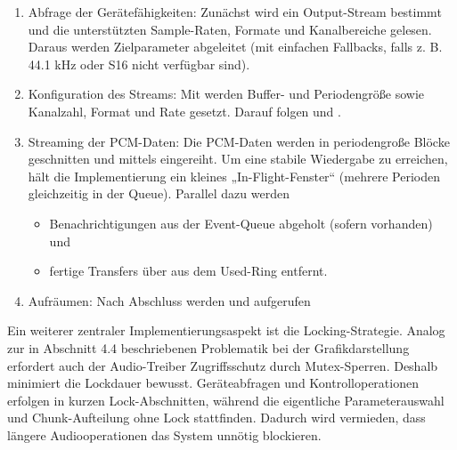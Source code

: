 \begin{enumerate}
 \item Abfrage der Gerätefähigkeiten: Zunächst wird ein Output-Stream bestimmt und die unterstützten Sample-Raten, Formate und Kanalbereiche gelesen. Daraus werden Zielparameter abgeleitet (mit einfachen Fallbacks, falls z. B. 44.1 kHz oder S16 nicht verfügbar sind).
 \item Konfiguration des Streams: Mit  werden Buffer- und Periodengröße sowie Kanalzahl, Format und Rate gesetzt. Darauf folgen  und .
 \item Streaming der PCM-Daten: Die PCM-Daten werden in periodengroße Blöcke geschnitten und mittels  eingereiht. Um eine stabile Wiedergabe zu erreichen, hält die Implementierung ein kleines „In-Flight-Fenster“ (mehrere Perioden gleichzeitig in der Queue). Parallel dazu werden
 \begin{itemize}
 \item Benachrichtigungen aus der Event-Queue abgeholt (sofern vorhanden) und
 \item fertige Transfers über  aus dem Used-Ring entfernt.
\end{itemize}
 \item Aufräumen: Nach Abschluss werden  und  aufgerufen
\end{enumerate}

Ein weiterer zentraler Implementierungsaspekt ist die Locking-Strategie. Analog zur in Abschnitt 4.4 beschriebenen Problematik bei der Grafikdarstellung erfordert auch der Audio-Treiber Zugriffsschutz durch Mutex-Sperren. Deshalb minimiert  die Lockdauer bewusst. Geräteabfragen und Kontrolloperationen erfolgen in kurzen Lock-Abschnitten, während die eigentliche Parameterauswahl und Chunk-Aufteilung ohne Lock stattfinden. Dadurch wird vermieden, dass längere Audiooperationen das System unnötig blockieren.